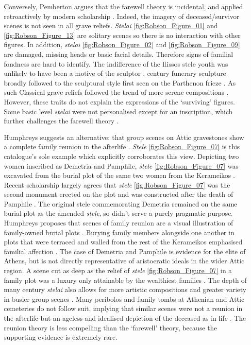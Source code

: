 Conversely, Pemberton argues that the farewell theory is incidental, and applied retroactively by modern scholarship \parencite[50]{Pemberton1989}.
Indeed, the imagery of deceased/survivor scenes is not seen in all grave reliefs. \textit{Stelai} \ref{fig:Robson_Figure_01} and \ref{fig:Robson_Figure_13} are solitary scenes so there is no interaction with other figures.
In addition, \textit{stelai} \ref{fig:Robson_Figure_02} and \ref{fig:Robson_Figure_09} are damaged, missing heads or basic facial details.
Therefore signs of familial fondness are hard to identify. The indifference of the Ilissos stele youth was unlikely to have been a motive of the sculptor \parencite[14]{Clairmont1995}.  century \BC funerary sculpture broadly followed to the sculptural style first seen on the Parthenon frieze \parencite[197]{Osborne1998}.
As such Classical grave reliefs followed the trend of more serene compositions \parencite[195]{Wasserman1969}.
However, these traits do not explain the expressions of the \enquote*{surviving} figures. Some basic level \textit{stelai} were not personalised except for an inscription, which further challenges the farewell theory \parencite[66]{Oliver2000}.

Humphreys suggests an alternative: that group scenes on Attic gravestones show a complete family reunion in the afterlife \parencite[106]{Humphreys1993}. \textit{Stele} \ref{fig:Robson_Figure_07} is this catalogue’s sole example which explicitly corroborates this view.
Depicting two women inscribed as Demetria and Pamphile, \textit{stele} \ref{fig:Robson_Figure_07} was excavated from the burial plot of the same two women from the Kerameikos \parencite[256]{Richter1954}.
Recent scholarship largely agrees that \textit{stele} \ref{fig:Robson_Figure_07} was the second monument erected on the plot and was constructed after the death of Pamphile \parencite[636]{Closterman2007}.
The original stele commemorating Demetria remained on the same burial plot as the amended \textit{stele}, so didn't serve a purely pragmatic purpose. Humphreys proposes that scenes of family reunion are a visual illustration of family-owned burial plots \parencite[2]{Humphreys1993}.
Burying family members alongside one another in plots that were terraced and walled from the rest of the Kerameikos emphasised familial affection \parencite[114]{Boardman1995}.
The case of Demetria and Pamphile is evidence for the elite of Athens, but is not directly representative of aristocratic ideals in the wider Attic region. A scene cut as deep as the relief of \textit{stele} \ref{fig:Robson_Figure_07} in a family plot was a luxury only attainable by the wealthiest families \parencite[124]{Sourvinouinwood1995b}.
The depth of many  century \BC \textit{stelai} also allows for more artistic compositions and greater variety in busier group scenes \parencite[185]{Neer2010}.
Many peribolos and family tombs at Athenian and Attic cemeteries do not follow suit, implying that similar scenes were not a reunion in the afterlife but an ageless and idealised depiction of the deceased as in life \parencite[194]{Wasserman1969}. The reunion theory is less compelling than the \enquote*{farewell} theory, because the supporting evidence is extremely rare.

